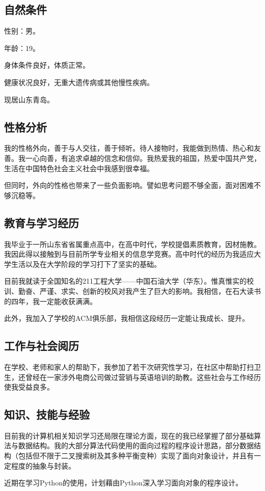 \documentclass{article}
\begin{document}
\thispagestyle{empty}
\newpage
\setcounter{page}{1}
\subsection{自然条件}
性别：男。\par
年龄：19。\par
身体条件良好，体质正常。\par
健康状况良好，无重大遗传病或其他慢性疾病。\par
现居山东青岛。

\subsection{性格分析}
我的性格外向，善于与人交往，善于倾听。待人接物时，我能做到热情、热心和友善。我一心向善，有追求卓越的信念和信仰。我热爱我的祖国，热爱中国共产党，生活在中国特色社会主义社会中我感到很幸福。\par
但同时，外向的性格也带来了一些负面影响。譬如思考问题不够全面，面对困难不够沉稳等。

\subsection{教育与学习经历}
我毕业于一所山东省省属重点高中，在高中时代，学校提倡素质教育，因材施教。我因此得以接触到与目前所学专业相关的信息学竞赛。高中时代的经历为我适应大学生活以及在大学阶段的学习打下了坚实的基础。\par
目前我就读于全国知名的211工程大学——中国石油大学（华东）。惟真惟实的校训、勤奋、严谨、求实、创新的校风对我产生了巨大的影响。我相信，在石大读书的四年，我一定能收获满满。\par
此外，我加入了学校的ACM俱乐部，我相信这段经历一定能让我成长、提升。

\subsection{工作与社会阅历}
在学校、老师和家人的帮助下，我参加了若干次研究性学习，在社区中帮助打扫卫生，还曾经在一家涉外电商公司做过营销与英语培训的助教。这些社会与工作经历使我受益良多。

\subsection{知识、技能与经验}
目前我的计算机相关知识学习还局限在理论方面，现在的我已经掌握了部分基础算法与数据结构。我的大部分算法代码使用的面向过程的程序设计思路，部分数据结构（包括但不限于二叉搜索树及其多种平衡变种）实现了面向对象设计，并且有一定程度的抽象与封装。\par
近期在学习Python的使用，计划藉由Python深入学习面向对象的程序设计。
\end{document}
